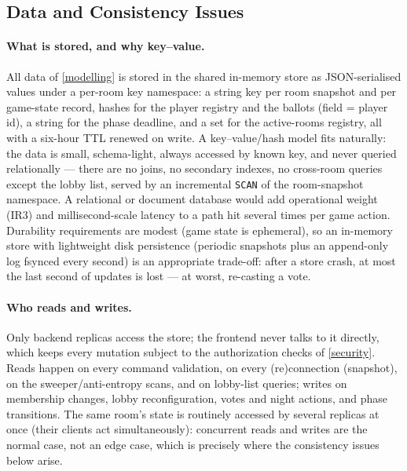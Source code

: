 \documentclass{scrartcl}
\begin{document}
\subsection{Data and Consistency Issues}\label{data-and-consistency-issues}

\paragraph{What is stored, and why key--value.}
All data of \cref{modelling} is stored in the shared in-memory store as
JSON-serialised values under a per-room key namespace: a string key per room
snapshot and per game-state record, hashes for the player registry and the
ballots (field = player id), a string for the phase deadline, and a set for the
active-rooms registry, all with a six-hour TTL renewed on write. A
key--value/hash model fits naturally: the data is small, schema-light, always
accessed by known key, and never queried relationally --- there are no joins, no
secondary indexes, no cross-room queries except the lobby list, served by an
incremental \texttt{SCAN} of the room-snapshot namespace. A relational or
document database would add operational weight (IR3) and millisecond-scale
latency to a path hit several times per game action. Durability requirements are
modest (game state is ephemeral), so an in-memory store with lightweight disk
persistence (periodic snapshots plus an append-only log fsynced every second) is
an appropriate trade-off: after a store crash, at most the last second of updates
is lost --- at worst, re-casting a vote.

\paragraph{Who reads and writes.}
Only backend replicas access the store; the frontend never talks to it directly,
which keeps every mutation subject to the authorization checks of
\cref{security}. Reads happen on every command validation, on every (re)connection
(snapshot), on the sweeper/anti-entropy scans, and on lobby-list queries; writes
on membership changes, lobby reconfiguration, votes and night actions, and phase
transitions. The same room's state is routinely accessed by several replicas at
once (their clients act simultaneously): concurrent reads and writes are the
normal case, not an edge case, which is precisely where the consistency issues
below arise.
\end{document}
